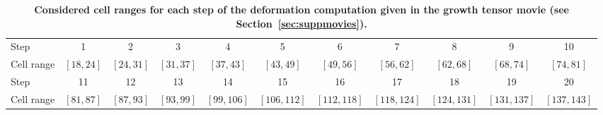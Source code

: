 \documentclass[11pt,a4paper, final]{article}
\begin{document}
\begin{table}
\small
	\begin{center}
		\begin{tabular}[h]{@{}lcccccccccc@{}}
		\toprule
		Step & 1 & 2 & 3 & 4 & 5 & 6 & 7 & 8 & 9 & 10\\
		Cell range & $[18, 24]$ & $[24, 31]$ & $[31, 37]$ & $[37, 43]$ & $[43, 49]$ & $[49, 56]$ & $[56, 62]$ & $[62, 68]$ & $[68, 74]$ & $[74, 81]$\\
		\midrule
		Step & 11 & 12 & 13 & 14 & 15 & 16 & 17 & 18 & 19 & 20\\
		Cell range & $[81, 87]$ & $[87, 93]$ & $[93, 99]$ & $[99, 106]$ & $[106, 112]$ & $[112, 118]$ & $[118, 124]$ & $[124, 131]$ & $[131, 137]$ & $[137, 143]$\\
		\bottomrule
		\end{tabular}
	\end{center}
	\caption[Considered cell ranges for each step of the deformation computation.]{\textbf{Considered cell ranges for each step of the deformation computation given in the growth tensor movie (see Section~\ref{sec:suppmovies}).}
	}
	\label{tab:growthTensor}
\end{table}
%
\clearpage
%
\end{document}
